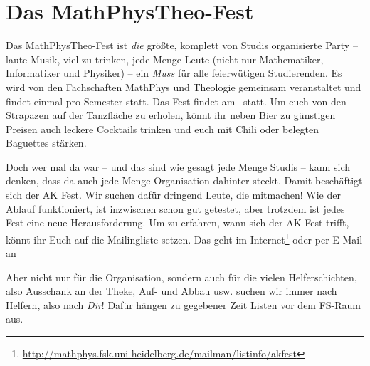 \section{Das MathPhysTheo-Fest}

Das MathPhysTheo-Fest ist \emph{die} größte, komplett von Studis organisierte Party -- laute Musik, viel zu trinken, jede Menge Leute (nicht nur Mathematiker, Informatiker und Physiker) -- ein \emph{Muss} für alle feierwütigen Studierenden. Es wird von den Fachschaften MathPhys und Theologie gemeinsam veranstaltet und findet einmal pro Semester statt. Das Fest findet am \mathphystheotermin\ statt. Um euch von den Strapazen auf der Tanzfläche zu erholen, könnt ihr neben Bier zu günstigen Preisen auch leckere Cocktails trinken und euch mit Chili oder belegten Baguettes stärken.

Doch wer mal da war -- und das sind wie gesagt jede Menge Studis -- kann sich denken, dass da auch jede Menge Organisation dahinter steckt. Damit beschäftigt sich der AK Fest. Wir suchen dafür dringend Leute, die mitmachen! Wie der Ablauf funktioniert, ist inzwischen schon gut getestet, aber trotzdem ist jedes Fest eine neue Herausforderung. Um zu erfahren, wann sich der AK Fest trifft, könnt ihr Euch auf die Mailingliste setzen. Das geht im Internet\footnote{\url{http://mathphys.fsk.uni-heidelberg.de/mailman/listinfo/akfest}} oder per E-Mail an 

Aber nicht nur für die Organisation, sondern auch für die vielen Helferschichten, also Ausschank an der Theke, Auf- und Abbau usw. suchen wir immer nach Helfern, also nach \emph{Dir}! Dafür hängen zu gegebener Zeit Listen vor dem FS-Raum aus.

